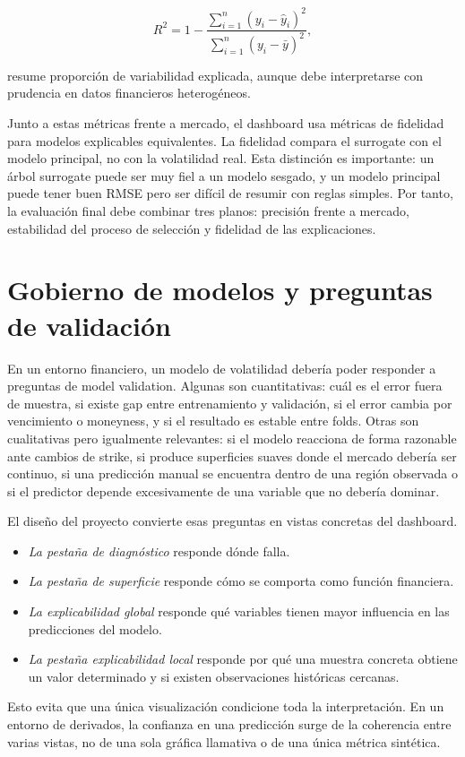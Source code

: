 \begin{equation}
R^2 = 1-\frac{\sum_{i=1}^{n}(y_i-\hat{y}_i)^2}{\sum_{i=1}^{n}(y_i-\bar{y})^2},
\label{eq:r2}
\end{equation}

resume proporción de variabilidad explicada, aunque debe interpretarse con prudencia en datos financieros heterogéneos.

Junto a estas métricas frente a mercado, el dashboard usa métricas de fidelidad para modelos explicables equivalentes. La fidelidad compara el surrogate con el modelo principal, no con la volatilidad real. Esta distinción es importante: un árbol surrogate puede ser muy fiel a un modelo sesgado, y un modelo principal puede tener buen RMSE pero ser difícil de resumir con reglas simples. Por tanto, la evaluación final debe combinar tres planos: precisión frente a mercado, estabilidad del proceso de selección y fidelidad de las explicaciones.


\section{Gobierno de modelos y preguntas de validación}
\label{sec:gobierno-modelos}

En un entorno financiero, un modelo de volatilidad debería poder responder a preguntas de model validation. Algunas son cuantitativas: cuál es el error fuera de muestra, si existe gap entre entrenamiento y validación, si el error cambia por vencimiento o moneyness, y si el resultado es estable entre folds. Otras son cualitativas pero igualmente relevantes: si el modelo reacciona de forma razonable ante cambios de strike, si produce superficies suaves donde el mercado debería ser continuo, si una predicción manual se encuentra dentro de una región observada o si el predictor depende excesivamente de una variable que no debería dominar.

El diseño del proyecto convierte esas preguntas en vistas concretas del dashboard. 
\begin{itemize}
    \item \textit{La pestaña de diagnóstico} responde dónde falla. 
    \item \textit{La pestaña de superficie} responde cómo se comporta como función financiera. 
    \item \textit{La explicabilidad global} responde qué variables tienen mayor influencia en las predicciones del modelo. 
    \item \textit{La pestaña explicabilidad local} responde por qué una muestra concreta obtiene un valor determinado y si existen observaciones históricas cercanas.
\end{itemize}

Esto evita que una única visualización condicione toda la interpretación. En un entorno de derivados, la confianza en una predicción surge de la coherencia entre varias vistas, no de una sola gráfica llamativa o de una única métrica sintética.


